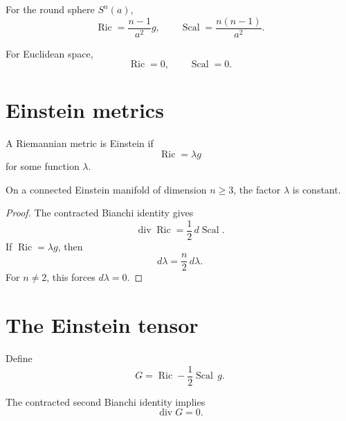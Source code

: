 \begin{example}\label{ex:vii27-sphere}
For the round sphere \(S^n(a)\),
\[
\operatorname{Ric}
=
\frac{n-1}{a^2}g,
\qquad
\operatorname{Scal}
=
\frac{n(n-1)}{a^2}.
\]
\end{example}

\begin{example}\label{ex:vii27-euclidean}
For Euclidean space,
\[
\operatorname{Ric}=0,
\qquad
\operatorname{Scal}=0.
\]
\end{example}

\section{Einstein metrics}

\begin{definition}\label{def:vii27-einstein}
A Riemannian metric is Einstein if
\[
\operatorname{Ric}=\lambda g
\]
for some function \(\lambda\).
\end{definition}

\begin{proposition}\label{prop:vii27-einstein-lambda}
On a connected Einstein manifold of dimension \(n\ge3\), the factor \(\lambda\) is
constant.
\end{proposition}

\begin{proof}
The contracted Bianchi identity gives
\[
\operatorname{div}\operatorname{Ric}
=
\frac12\,d\operatorname{Scal}.
\]
If \(\operatorname{Ric}=\lambda g\), then
\[
d\lambda
=
\frac n2\,d\lambda.
\]
For \(n\ne2\), this forces \(d\lambda=0\).
\end{proof}

\section{The Einstein tensor}

\begin{definition}\label{def:vii27-einstein-tensor}
Define
\[
G
=
\operatorname{Ric}
-\frac12\operatorname{Scal}\,g.
\]
\end{definition}

\begin{theorem}\label{thm:vii27-divfree}
The contracted second Bianchi identity implies
\[
\operatorname{div}G=0.
\]
\end{theorem}

